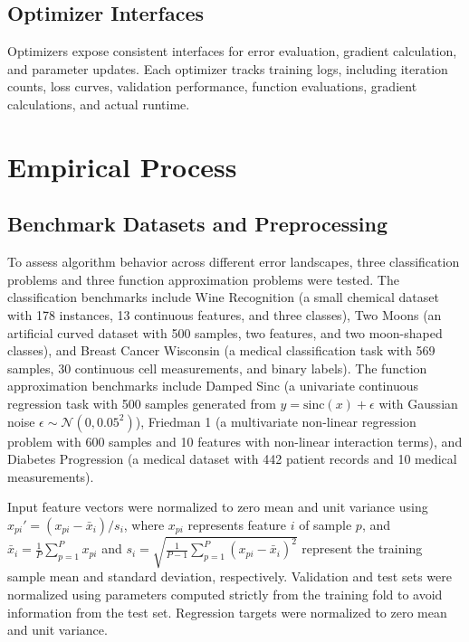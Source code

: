 \documentclass[conference,10pt]{IEEEtran}
\begin{document}
\subsection{Optimizer Interfaces}
Optimizers expose consistent interfaces for error evaluation, gradient calculation, and parameter updates. Each optimizer tracks training logs, including iteration counts, loss curves, validation performance, function evaluations, gradient calculations, and actual runtime.

\section{Empirical Process}

\subsection{Benchmark Datasets and Preprocessing}
To assess algorithm behavior across different error landscapes, three classification problems and three function approximation problems were tested. The classification benchmarks include Wine Recognition (a small chemical dataset with 178 instances, 13 continuous features, and three classes), Two Moons (an artificial curved dataset with 500 samples, two features, and two moon-shaped classes), and Breast Cancer Wisconsin (a medical classification task with 569 samples, 30 continuous cell measurements, and binary labels). The function approximation benchmarks include Damped Sinc (a univariate continuous regression task with 500 samples generated from $y = \text{sinc}(x) + \epsilon$ with Gaussian noise $\epsilon \sim \mathcal{N}(0, 0.05^2)$), Friedman 1 (a multivariate non-linear regression problem with 600 samples and 10 features with non-linear interaction terms), and Diabetes Progression (a medical dataset with 442 patient records and 10 medical measurements).

Input feature vectors were normalized to zero mean and unit variance using $x_{pi}' = (x_{pi} - \bar{x}_i)/s_i$, where $x_{pi}$ represents feature $i$ of sample $p$, and $\bar{x}_i = \frac{1}{P} \sum_{p=1}^P x_{pi}$ and $s_i = \sqrt{\frac{1}{P-1}\sum_{p=1}^P (x_{pi} - \bar{x}_i)^2}$ represent the training sample mean and standard deviation, respectively. Validation and test sets were normalized using parameters computed strictly from the training fold to avoid information from the test set. Regression targets were normalized to zero mean and unit variance.
\end{document}
